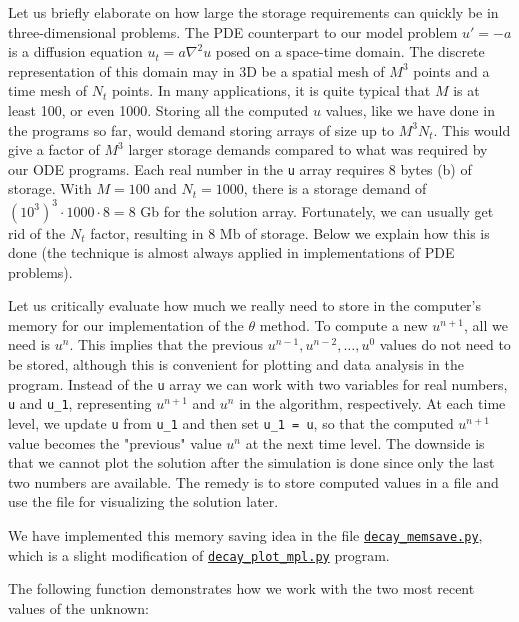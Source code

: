 \documentclass[graybox,sectrefs,envcountresetchap,open=right,final]{svmonodo}
\begin{document}
Let us briefly elaborate on how large the storage requirements can
quickly be in three-dimensional problems.  The PDE counterpart to our
model problem $u'=-a$ is a diffusion equation $u_t = a\nabla^2 u$
posed on a space-time domain. The discrete representation of this
domain may in 3D be a spatial mesh of $M^3$ points and a time mesh of
$N_t$ points.  In many applications, it is quite typical that $M$ is
at least 100, or even 1000.  Storing all the computed $u$ values, like
we have done in the programs so far, would demand storing arrays of
size up to $M^3N_t$. This would give a factor of $M^3$ larger storage
demands compared to what was required by our ODE programs. Each real
number in the \texttt{u} array requires 8 bytes (b) of storage. With $M=100$
and $N_t=1000$, there is a storage demand of $(10^3)^3\cdot 1000\cdot
8 = 8$ Gb for the solution array.  Fortunately, we can usually get rid
of the $N_t$ factor, resulting in 8 Mb of storage.  Below we explain
how this is done (the technique is almost always applied in
implementations of PDE problems).

Let us critically evaluate how much we really need to store in the
computer's memory for our implementation of the $\theta$ method. To
compute a new $u^{n+1}$, all we need is $u^n$. This implies that the
previous $u^{n-1},u^{n-2},\dots,u^0$ values do not need to be stored,
although this is convenient for plotting and data analysis in the
program.  Instead of the \texttt{u} array we can work with two variables for
real numbers, \texttt{u} and \Verb!u_1!, representing $u^{n+1}$ and $u^n$ in the
algorithm, respectively.  At each time level, we update \texttt{u} from \Verb!u_1!
and then set \Verb!u_1 = u!, so that the computed $u^{n+1}$ value becomes
the "previous" value $u^n$ at the next time level. The downside is
that we cannot plot the solution after the simulation is done since
only the last two numbers are available.  The remedy is to store
computed values in a file and use the file for visualizing the
solution later.

We have implemented this memory saving idea in the file
\href{{http://tinyurl.com/ofkw6kc/alg/decay_memsave.py}}{\nolinkurl{decay_memsave.py}}, which is a
slight modification of \href{{http://tinyurl.com/ofkw6kc/alg/decay_plot_mpl.py}}{\nolinkurl{decay_plot_mpl.py}} program.

The following function demonstrates how we work with the two most
recent values of the unknown:
\end{document}
